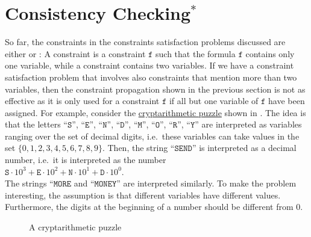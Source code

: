 \section{Consistency Checking$^*$\label{sec:consistency}}
So far, the constraints in the constraints satisfaction problems discussed are either  
or :  A  constraint is a constraint $\texttt{f}$
such that the formula $\texttt{f}$ contains only one variable, while a  constraint
contains two variables.  If we have a constraint satisfaction problem that involves also constraints that
mention more than two variables, then the constraint propagation shown in the previous section is not
as effective as it is only used for a constraint $\texttt{f}$ if all but one variable of $\texttt{f}$ have been assigned.
For example, consider the \href{https://en.wikipedia.org/wiki/Verbal_arithmetic}{cryptarithmetic puzzle} shown
in .  The idea is that the letters 
``$\texttt{S}$'', ``$\texttt{E}$'', ``$\texttt{N}$'', ``$\texttt{D}$'', ``$\texttt{M}$'', ``$\texttt{O}$'', ``$\texttt{R}$'', ``$\texttt{Y}$'' 
are interpreted as variables ranging over the set of decimal digits, i.e.~these variables can take values in
the set $\{0,1,2,3,4,5,6,7,8,9\}$.  Then, the string ``$\texttt{SEND}$'' is interpreted as a decimal number,
i.e.~it is interpreted as the number
\\[0.2cm]
\hspace*{1.3cm}
$\texttt{S} \cdot 10^3 + \texttt{E} \cdot 10^2 + \texttt{N} \cdot 10^1 + \texttt{D} \cdot 10^0$.
\\[0.2cm]
The strings ``$\texttt{MORE}$ and ``$\texttt{MONEY}$'' are interpreted similarly. To make the problem
interesting, the assumption is that different variables have different values.  Furthermore, the
digits at the beginning of a number should be different from $0$.


\begin{figure}[!ht]
\centering
{}

\caption{A cryptarithmetic puzzle}
\label{fig:send-more-money.pdf}
\end{figure}


